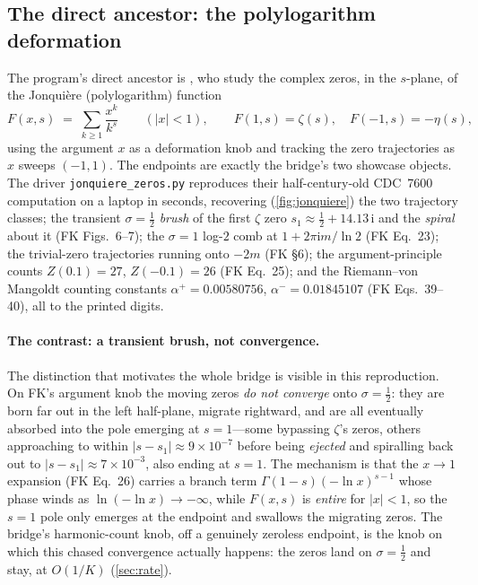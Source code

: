 \documentclass[11pt]{article}
\theoremstyle{definition}
\newcommand{\iu}{\mathrm{i}}
\begin{document}
\subsection{The direct ancestor: the polylogarithm deformation}\label{app:fk}

The program's direct ancestor is \citet{FornbergKolbig1975}, who study the complex
zeros, in the $s$-plane, of the Jonqui\`ere (polylogarithm) function
\begin{equation}\label{eq:polylog}
  F(x,s) \;=\; \sum_{k\ge1}\frac{x^{k}}{k^{s}}\qquad(|x|<1),
  \qquad F(1,s)=\zeta(s),\quad F(-1,s)=-\eta(s),
\end{equation}
using the argument $x$ as a deformation knob and tracking the zero trajectories as
$x$ sweeps $(-1,1)$. The endpoints are exactly the bridge's two showcase objects. The
driver \texttt{jonquiere\_zeros.py} reproduces their half-century-old CDC~7600
computation on a laptop in seconds, recovering (\cref{fig:jonquiere}) the two
trajectory classes; the transient $\sigma=\tfrac12$ \emph{brush} of the first $\zeta$
zero $s_1\approx\tfrac12+14.13\,\iu$ and the \emph{spiral} about it (FK Figs.~6--7);
the $\sigma=1$ log-$2$ comb at $1+2\pi\iu m/\ln2$ (FK Eq.~23); the trivial-zero
trajectories running onto $-2m$ (FK \S6); the argument-principle counts $Z(0.1)=27$,
$Z(-0.1)=26$ (FK Eq.~25); and the Riemann--von Mangoldt counting constants
$\alpha^{+}=0.00580756$, $\alpha^{-}=0.01845107$ (FK Eqs.~39--40), all to the printed
digits.

\paragraph{The contrast: a transient brush, not convergence.}
The distinction that motivates the whole bridge is visible in this reproduction. On
FK's argument knob the moving zeros \emph{do not converge} onto $\sigma=\tfrac12$:
they are born far out in the left half-plane, migrate rightward, and are all
eventually absorbed into the pole emerging at $s=1$---some bypassing $\zeta$'s zeros,
others approaching to within $|s-s_1|\approx9\times10^{-7}$ before being
\emph{ejected} and spiralling back out to $|s-s_1|\approx7\times10^{-3}$, also ending
at $s=1$. The mechanism is that the $x\to1$ expansion (FK Eq.~26) carries a branch
term $\Gamma(1-s)(-\ln x)^{s-1}$ whose phase winds as $\ln(-\ln x)\to-\infty$, while
$F(x,s)$ is \emph{entire} for $|x|<1$, so the $s=1$ pole only emerges at the endpoint
and swallows the migrating zeros. The bridge's harmonic-count knob, off a genuinely
zeroless endpoint, is the knob on which this chased convergence actually happens: the
zeros land on $\sigma=\tfrac12$ and stay, at $O(1/K)$ (\cref{sec:rate}).
\end{document}
